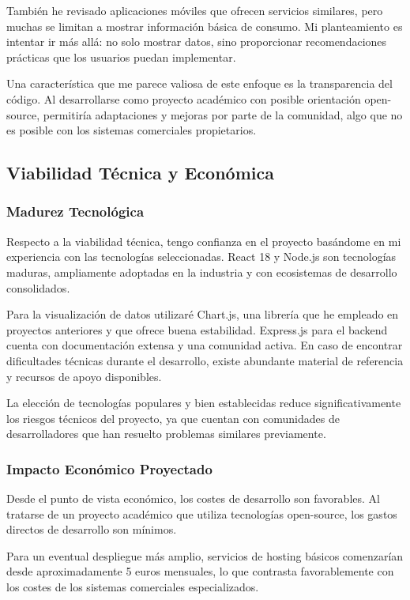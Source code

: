 \documentclass[12pt,a4paper,spanish]{article}
\begin{document}
También he revisado aplicaciones móviles que ofrecen servicios similares, pero muchas se limitan a mostrar información básica de consumo. Mi planteamiento es intentar ir más allá: no solo mostrar datos, sino proporcionar recomendaciones prácticas que los usuarios puedan implementar.

Una característica que me parece valiosa de este enfoque es la transparencia del código. Al desarrollarse como proyecto académico con posible orientación open-source, permitiría adaptaciones y mejoras por parte de la comunidad, algo que no es posible con los sistemas comerciales propietarios.

\subsection{Viabilidad Técnica y Económica}

\subsubsection{Madurez Tecnológica}

Respecto a la viabilidad técnica, tengo confianza en el proyecto basándome en mi experiencia con las tecnologías seleccionadas. React 18 y Node.js son tecnologías maduras, ampliamente adoptadas en la industria y con ecosistemas de desarrollo consolidados.

Para la visualización de datos utilizaré Chart.js, una librería que he empleado en proyectos anteriores y que ofrece buena estabilidad. Express.js para el backend cuenta con documentación extensa y una comunidad activa. En caso de encontrar dificultades técnicas durante el desarrollo, existe abundante material de referencia y recursos de apoyo disponibles.

La elección de tecnologías populares y bien establecidas reduce significativamente los riesgos técnicos del proyecto, ya que cuentan con comunidades de desarrolladores que han resuelto problemas similares previamente.

\subsubsection{Impacto Económico Proyectado}

Desde el punto de vista económico, los costes de desarrollo son favorables. Al tratarse de un proyecto académico que utiliza tecnologías open-source, los gastos directos de desarrollo son mínimos.

Para un eventual despliegue más amplio, servicios de hosting básicos comenzarían desde aproximadamente 5 euros mensuales, lo que contrasta favorablemente con los costes de los sistemas comerciales especializados.
\end{document}
